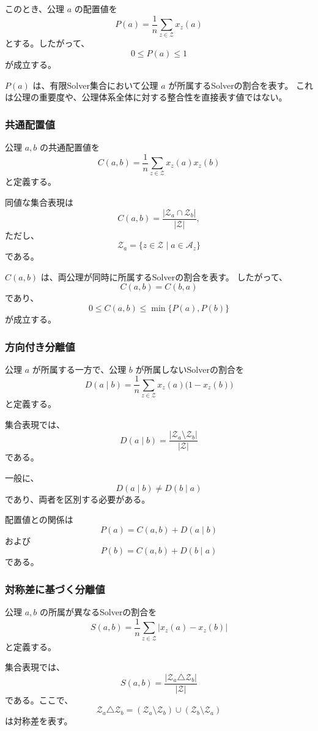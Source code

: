 \documentclass[a4paper,11pt]{ltjsarticle}
\begin{document}
このとき、公理 $a$ の配置値を
\[
\boxed{
P(a)=\frac{1}{n}\sum_{z\in\mathcal{Z}}x_z(a)
}
\tag{15}
\]
とする。したがって、
\[
0\leq P(a)\leq 1
\]
が成立する。

$P(a)$ は、有限Solver集合において公理 $a$ が所属するSolverの割合を表す。
これは公理の重要度や、公理体系全体に対する整合性を直接表す値ではない。

\subsubsection{共通配置値}

公理 $a,b$ の共通配置値を
\[
\boxed{
C(a,b)=
\frac{1}{n}
\sum_{z\in\mathcal{Z}}x_z(a)x_z(b)
}
\tag{16}
\]
と定義する。

同値な集合表現は
\[
C(a,b)=
\frac{|\mathcal{Z}_a\cap\mathcal{Z}_b|}{|\mathcal{Z}|},
\]
ただし、
\[
\mathcal{Z}_a=
\{z\in\mathcal{Z}\mid a\in\mathcal{A}_z\}
\]
である。

$C(a,b)$ は、両公理が同時に所属するSolverの割合を表す。
したがって、
\[
C(a,b)=C(b,a)
\]
であり、
\[
0\leq C(a,b)\leq\min\{P(a),P(b)\}
\]
が成立する。

\subsubsection{方向付き分離値}

公理 $a$ が所属する一方で、公理 $b$ が所属しないSolverの割合を
\[
\boxed{
D(a\mid b)=
\frac{1}{n}
\sum_{z\in\mathcal{Z}}
x_z(a)\bigl(1-x_z(b)\bigr)
}
\tag{17}
\]
と定義する。

集合表現では、
\[
D(a\mid b)=
\frac{|\mathcal{Z}_a\setminus\mathcal{Z}_b|}
{|\mathcal{Z}|}
\]
である。

一般に、
\[
D(a\mid b)\ne D(b\mid a)
\]
であり、両者を区別する必要がある。

配置値との関係は
\[
\boxed{
P(a)=C(a,b)+D(a\mid b)
}
\tag{18}
\]
および
\[
\boxed{
P(b)=C(a,b)+D(b\mid a)
}
\tag{19}
\]
である。

\subsubsection{対称差に基づく分離値}

公理 $a,b$ の所属が異なるSolverの割合を
\[
\boxed{
S(a,b)=
\frac{1}{n}\sum_{z\in\mathcal{Z}}
|x_z(a)-x_z(b)|
}
\tag{20}
\]
と定義する。

集合表現では、
\[
S(a,b)=
\frac{|\mathcal{Z}_a\triangle\mathcal{Z}_b|}
{|\mathcal{Z}|}
\]
である。ここで、
\[
\mathcal{Z}_a\triangle\mathcal{Z}_b
=
(\mathcal{Z}_a\setminus\mathcal{Z}_b)
\cup
(\mathcal{Z}_b\setminus\mathcal{Z}_a)
\]
は対称差を表す。
\end{document}
